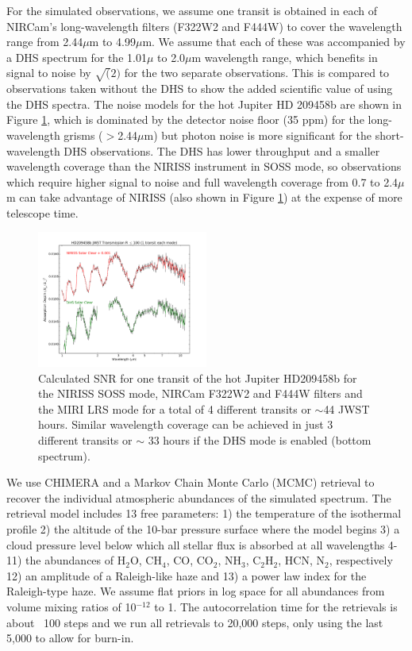 \documentclass{emulateapj}
\begin{document}
For the simulated observations, we assume one transit is obtained in each of NIRCam's long-wavelength filters (F322W2 and F444W) to cover the wavelength range from 2.44$\mu$m to 4.99$\mu$m. We assume that each of these was accompanied by a DHS spectrum for the 1.01$\mu$ to 2.0$\mu$m wavelength range, which benefits in signal to noise by $\sqrt(2)$ for the two separate observations. This is compared to observations taken without the DHS to show the added scientific value of using the DHS spectra. The noise models for the hot Jupiter HD 209458b are shown in Figure \ref{fig:DHSvsNIRISS209}, which is dominated by the detector noise floor (35 ppm) for the long-wavelength grisms ($>$2.44$\mu$m) but photon noise is more significant for the short-wavelength DHS observations. The DHS has lower throughput and a smaller wavelength coverage than the NIRISS instrument in SOSS mode, so observations which require higher signal to noise and full wavelength coverage from 0.7 to 2.4$\mu$m can take advantage of NIRISS (also shown in Figure \ref{fig:DHSvsNIRISS209}) at the expense of more telescope time.

\begin{figure}
\centering
\includegraphics[width=0.5\textwidth]{HD209458b_solar_clear_1transit_DHS_vs_NIRISS_NIRCam_MIRILRS_R100.pdf}
\caption{Calculated SNR for one transit of the hot Jupiter HD209458b for the NIRISS SOSS mode, NIRCam F322W2 and F444W filters and the MIRI LRS mode for a total of 4 different transits or $\sim$44 JWST hours. Similar wavelength coverage can be achieved in just 3 different transits or $\sim$ 33 hours if the DHS mode is enabled (bottom spectrum).}\label{fig:DHSvsNIRISS209}
\end{figure}

We use CHIMERA and a Markov Chain Monte Carlo (MCMC) retrieval to recover the individual atmospheric abundances of the simulated spectrum. The retrieval model includes 13 free parameters: 1) the temperature of the isothermal profile 2) the altitude of the 10-bar pressure surface where the model begins 3) a cloud pressure level below which all stellar flux is absorbed at all wavelengths 4-11) the abundances of H$_2$O, CH$_4$, CO, CO$_2$, NH$_3$, C$_2$H$_2$, HCN, N$_2$, respectively 12) an amplitude of a Raleigh-like haze and 13) a power law index for the Raleigh-type haze. We assume flat priors in log space for all abundances from volume mixing ratios of 10$^{-12}$ to 1. The autocorrelation time for the retrievals is about ~100 steps and we run all retrievals to 20,000 steps, only using the last 5,000 to allow for burn-in.
\end{document}

